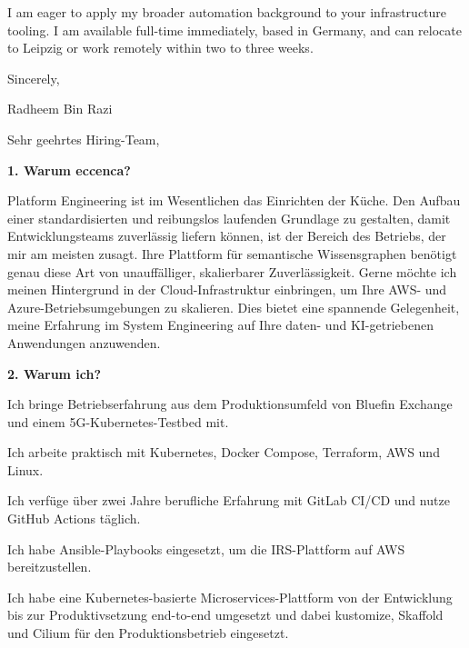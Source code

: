 \documentclass[11pt,a4paper]{coverletter}
\begin{document}
I am eager to apply my broader automation background to your infrastructure tooling. I am available full-time immediately, based in Germany, and can relocate to Leipzig or work remotely within two to three weeks.

\closing{Sincerely,}{Radheem Bin Razi}

\clearpage
{}


\opening{Sehr geehrtes Hiring-Team,}

\vspace{8pt}\noindent\textbf{1. Warum eccenca?}\par\vspace{3pt}

Platform Engineering ist im Wesentlichen das Einrichten der Küche. Den Aufbau einer standardisierten und reibungslos laufenden Grundlage zu gestalten, damit Entwicklungsteams zuverlässig liefern können, ist der Bereich des Betriebs, der mir am meisten zusagt. Ihre Plattform für semantische Wissensgraphen benötigt genau diese Art von unauffälliger, skalierbarer Zuverlässigkeit. Gerne möchte ich meinen Hintergrund in der Cloud-Infrastruktur einbringen, um Ihre AWS- und Azure-Betriebsumgebungen zu skalieren. Dies bietet eine spannende Gelegenheit, meine Erfahrung im System Engineering auf Ihre daten- und KI-getriebenen Anwendungen anzuwenden.

\vspace{8pt}\noindent\textbf{2. Warum ich?}\par\vspace{3pt}

\bullets

  \item Ich bringe Betriebserfahrung aus dem Produktionsumfeld von Bluefin Exchange und einem 5G-Kubernetes-Testbed mit.

  \item Ich arbeite praktisch mit Kubernetes, Docker Compose, Terraform, AWS und Linux.

  \item Ich verfüge über zwei Jahre berufliche Erfahrung mit GitLab CI/CD und nutze GitHub Actions täglich.

  \item Ich habe Ansible-Playbooks eingesetzt, um die IRS-Plattform auf AWS bereitzustellen.

  \item Ich habe eine Kubernetes-basierte Microservices-Plattform von der Entwicklung bis zur Produktivsetzung end-to-end umgesetzt und dabei kustomize, Skaffold und Cilium für den Produktionsbetrieb eingesetzt.
\end{document}
